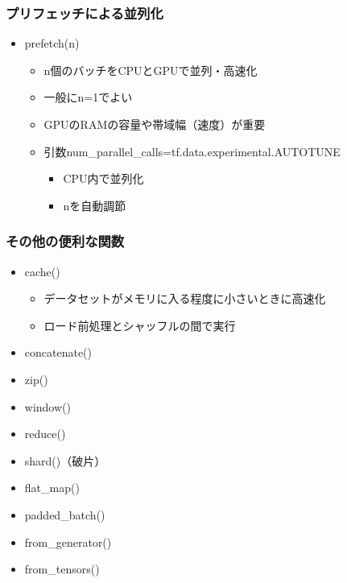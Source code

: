 \hypertarget{ux30d7ux30eaux30d5ux30a7ux30c3ux30c1ux306bux3088ux308bux4e26ux5217ux5316}{%
\subsubsection{プリフェッチによる並列化}\label{ux30d7ux30eaux30d5ux30a7ux30c3ux30c1ux306bux3088ux308bux4e26ux5217ux5316}}

\begin{itemize}
\tightlist
\item
  prefetch(n)

  \begin{itemize}
  \tightlist
  \item
    n個のバッチをCPUとGPUで並列・高速化
  \item
    一般にn=1でよい
  \item
    GPUのRAMの容量や帯域幅（速度）が重要
  \item
    引数num\_parallel\_calls=tf.data.experimental.AUTOTUNE

    \begin{itemize}
    \tightlist
    \item
      CPU内で並列化
    \item
      nを自動調節
    \end{itemize}
  \end{itemize}
\end{itemize}

\hypertarget{ux305dux306eux4ed6ux306eux4fbfux5229ux306aux95a2ux6570}{%
\subsubsection{その他の便利な関数}\label{ux305dux306eux4ed6ux306eux4fbfux5229ux306aux95a2ux6570}}

\begin{itemize}
\tightlist
\item
  cache()

  \begin{itemize}
  \tightlist
  \item
    データセットがメモリに入る程度に小さいときに高速化
  \item
    ロード前処理とシャッフルの間で実行
  \end{itemize}
\item
  concatenate()
\item
  zip()
\item
  window()
\item
  reduce()
\item
  shard()（破片）
\item
  flat\_map()
\item
  padded\_batch()
\item
  from\_generator()
\item
  from\_tensors()
\end{itemize}

